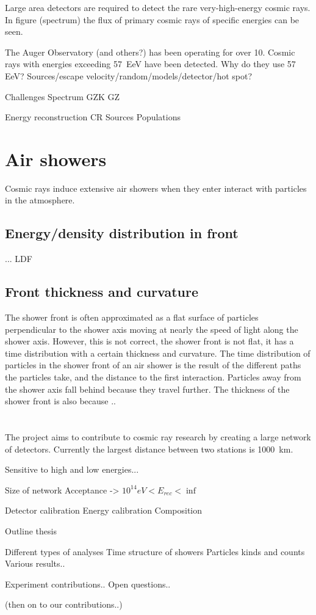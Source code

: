 Large area detectors are required to detect the rare very-high-energy
cosmic rays. In figure (spectrum) the flux of primary cosmic rays of
specific energies can be seen. 

The Auger Observatory (and others?) has been operating for over
\SI{10}{\year}. Cosmic rays with energies exceeding
\SI{57}{\exa\electronvolt} have been detected. Why do they use 57 EeV?
Sources/escape velocity/random/models/detector/hot spot?

Challenges
Spectrum
GZK
GZ

Energy reconstruction
CR Sources
Populations


\section{Air showers}

Cosmic rays induce extensive air showers when they enter interact with particles in the atmosphere.


\subsection{Energy/density distribution in front}

... LDF


\subsection{Front thickness and curvature}

The shower front is often approximated as a flat surface  of particles
perpendicular to the shower axis moving at nearly the speed of light
along the shower axis. However, this is not correct, the shower front is
not flat, it has a time distribution with a certain thickness and
curvature. The time distribution of particles in the shower front of an
air shower is the result of the different paths the particles take, and
the distance to the first interaction. Particles away from the shower
axis fall behind because they travel further. The thickness of the
shower front is also because ..


\section{\hisparc}

The \hisparc project aims to contribute to cosmic ray research by
creating a large network of detectors. Currently the largest distance
between two stations is \SI{1000}{\kilo\meter}.

Sensitive to high and low energies...



Size of network
Acceptance -> $10^{14} eV < E_{rec} < \inf$

Detector calibration
Energy calibration
Composition

Outline thesis

    Different types of analyses
    Time structure of showers
    Particles kinds and counts
    Various results..

Experiment contributions..
Open questions..

(then on to our contributions..)
